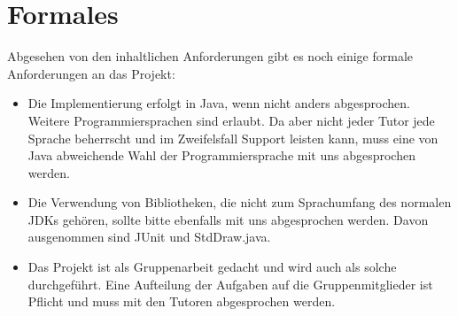 \documentclass{programmierpraktikum}
\begin{document}
\section{Formales}
Abgesehen von den inhaltlichen Anforderungen gibt es noch einige formale Anforderungen an das Projekt:
\begin{itemize}
  \item Die Implementierung erfolgt in Java, wenn nicht anders abgesprochen. Weitere
    Programmiersprachen sind erlaubt. Da aber nicht jeder Tutor jede Sprache beherrscht und im
    Zweifelsfall Support leisten kann, muss eine von Java abweichende Wahl der Programmiersprache
    mit uns abgesprochen werden.
  \item Die Verwendung von Bibliotheken, die nicht zum Sprachumfang des normalen JDKs gehören,
    sollte bitte ebenfalls mit uns abgesprochen werden. Davon ausgenommen sind JUnit und
    StdDraw.java.
  \item Das Projekt ist als Gruppenarbeit gedacht und wird auch als solche durchgeführt.
    Eine Aufteilung der Aufgaben auf die Gruppenmitglieder ist Pflicht und muss mit den
    Tutoren abgesprochen werden.
\end{itemize}
%
\end{document}
